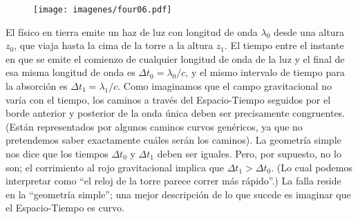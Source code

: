 \documentclass[11pt,b5paper,openany,twoside]{book}
\begin{document}
\begin{figure}[h]
\centering
\texttt{[image: imagenes/four06.pdf]}
\end{figure}

El físico en tierra emite un haz de luz con longitud de onda $\lambda_0$ desde una altura $z_0$, que viaja hasta la cima de la torre a la altura $z_1$.
El tiempo entre el instante en que se emite el comienzo de cualquier longitud de onda de la luz y el final de esa misma longitud de onda es $\Delta t_0 = \lambda_0/c$, y el mismo intervalo de tiempo para la absorción es $\Delta t_1=\lambda_1/c$.
Como imaginamos que el campo gravitacional no varía con el tiempo, los caminos a través del Espacio-Tiempo seguidos por el borde anterior y posterior de la onda única deben ser precisamente congruentes.
(Están representados por algunos caminos curvos genéricos, ya que no pretendemos saber exactamente cuáles serán los caminos).
La geometría simple nos dice que los tiempos $\Delta t_0$ y $\Delta t_1$ deben ser iguales.
Pero, por supuesto, no lo son; el corrimiento al rojo gravitacional implica que $\Delta t_1 > \Delta t_0$.
(Lo cual podemos interpretar como ``el reloj de la torre parece correr más rápido''.) La falla reside en la ``geometría simple''; una mejor descripción de lo que sucede es imaginar que el Espacio-Tiempo es curvo.
\end{document}
